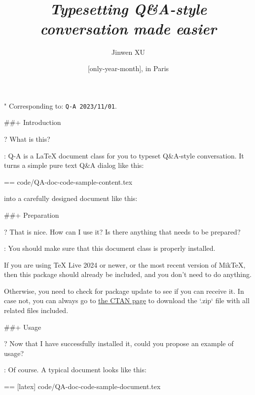 \documentclass[%
  use style = classical,
  scroll,
]{Q-A}
\title{\QApackage{}\\\smallskip\itshape Typesetting Q\&A-style conversation made easier}
\author{Jinwen XU}
\date{\TheDate{\PackageVersion}[only-year-month], in Paris}
\def\PackageVersion{2023/11/01}
\def\PackageSubVersion{}
\newcommand{\QApackage}{{\normalfont\textsf{Q-A}}}
\begin{document}
\maketitle

"
  Corresponding to: {\normalfont\texttt{\QApackage{}~\PackageVersion\PackageSubVersion}}.


##+ {Introduction}

?
  What is this?

:
  \QApackage{} is a \LaTeX{} document class for you to typeset Q\&A-style conversation. It turns a simple pure text Q\&A dialog like this:

  == {code/QA-doc-code-sample-content.tex}

  into a carefully designed document like this:

  \begin{center}
  \end{center}


##+ {Preparation}

?
  That is nice. How can I use it? Is there anything that needs to be prepared?

:
  You should make sure that this document class is properly installed.

  If you are using TeX Live 2024 or newer, or the most recent version of MikTeX, then this package should already be included, and you don't need to do anything.

  Otherwise, you need to check for package update to see if you can receive it. In case not, you can always go to \href{https://ctan.org/pkg/Q-A}{the CTAN page} to download the `.zip` file with all related files included.


##+ {Usage}

?
  Now that I have successfully installed it, could you propose an example of usage?

:
  Of course. A typical document looks like this:

  == [latex] {code/QA-doc-code-sample-document.tex}
\end{document}
